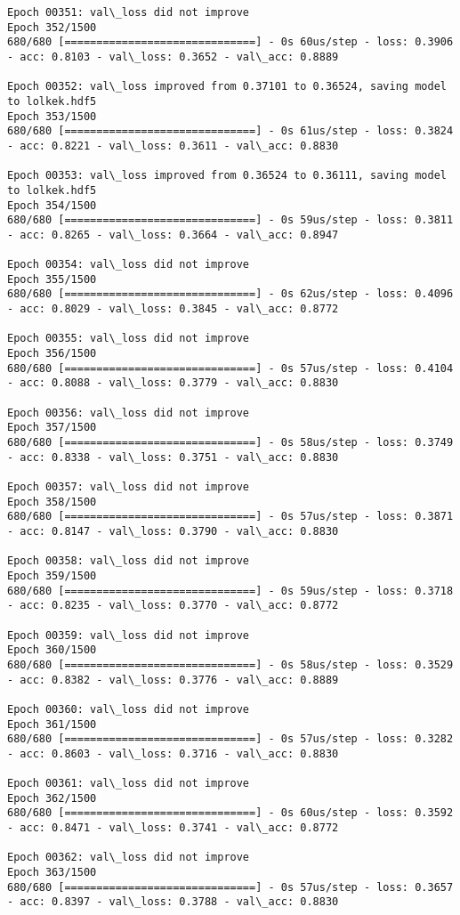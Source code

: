 \documentclass[11pt]{article}
\begin{document}
\begin{Verbatim}[commandchars=\\\{\}]
Epoch 00351: val\_loss did not improve
Epoch 352/1500
680/680 [==============================] - 0s 60us/step - loss: 0.3906 - acc: 0.8103 - val\_loss: 0.3652 - val\_acc: 0.8889

Epoch 00352: val\_loss improved from 0.37101 to 0.36524, saving model to lolkek.hdf5
Epoch 353/1500
680/680 [==============================] - 0s 61us/step - loss: 0.3824 - acc: 0.8221 - val\_loss: 0.3611 - val\_acc: 0.8830

Epoch 00353: val\_loss improved from 0.36524 to 0.36111, saving model to lolkek.hdf5
Epoch 354/1500
680/680 [==============================] - 0s 59us/step - loss: 0.3811 - acc: 0.8265 - val\_loss: 0.3664 - val\_acc: 0.8947

Epoch 00354: val\_loss did not improve
Epoch 355/1500
680/680 [==============================] - 0s 62us/step - loss: 0.4096 - acc: 0.8029 - val\_loss: 0.3845 - val\_acc: 0.8772

Epoch 00355: val\_loss did not improve
Epoch 356/1500
680/680 [==============================] - 0s 57us/step - loss: 0.4104 - acc: 0.8088 - val\_loss: 0.3779 - val\_acc: 0.8830

Epoch 00356: val\_loss did not improve
Epoch 357/1500
680/680 [==============================] - 0s 58us/step - loss: 0.3749 - acc: 0.8338 - val\_loss: 0.3751 - val\_acc: 0.8830

Epoch 00357: val\_loss did not improve
Epoch 358/1500
680/680 [==============================] - 0s 57us/step - loss: 0.3871 - acc: 0.8147 - val\_loss: 0.3790 - val\_acc: 0.8830

Epoch 00358: val\_loss did not improve
Epoch 359/1500
680/680 [==============================] - 0s 59us/step - loss: 0.3718 - acc: 0.8235 - val\_loss: 0.3770 - val\_acc: 0.8772

Epoch 00359: val\_loss did not improve
Epoch 360/1500
680/680 [==============================] - 0s 58us/step - loss: 0.3529 - acc: 0.8382 - val\_loss: 0.3776 - val\_acc: 0.8889

Epoch 00360: val\_loss did not improve
Epoch 361/1500
680/680 [==============================] - 0s 57us/step - loss: 0.3282 - acc: 0.8603 - val\_loss: 0.3716 - val\_acc: 0.8830

Epoch 00361: val\_loss did not improve
Epoch 362/1500
680/680 [==============================] - 0s 60us/step - loss: 0.3592 - acc: 0.8471 - val\_loss: 0.3741 - val\_acc: 0.8772

Epoch 00362: val\_loss did not improve
Epoch 363/1500
680/680 [==============================] - 0s 57us/step - loss: 0.3657 - acc: 0.8397 - val\_loss: 0.3788 - val\_acc: 0.8830


\end{Verbatim}
\end{document}
